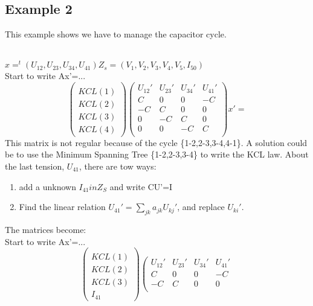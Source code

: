 \subsection{Example 2}
This example shows we have to manage the capacitor cycle.\\
\begin{figure}[h]
\centerline{
 \scalebox{0.6}{
    
 }
}\end{figure}\\
$x=^{t}(U_{12},U_{23},U_{34},U_{41})$$Z_{s}=(V_{1},V_{2},V_{3},V_{4},V_{5},I_{50})$\\
Start to write Ax'=...\
\[\left(\begin{array}{c}
  \\
KCL(1)\\KCL(2)\\KCL(3)\\KCL(4)
\end{array}\right)
\left(\begin{array}{cccc}
  U_{12}'&U_{23}'&U_{34}'&U_{41}'\\
  \hline
  C&0&0&-C\\
  -C&C&0&0\\
  0&-C&C&0\\
  0&0&-C&C\\  
\end{array}\right)x'=
\]
This matrix is not regular because of the cycle \{1-2,2-3,3-4,4-1\}. A solution could be to use the Minimum
Spanning Tree \{1-2,2-3,3-4\} to write the KCL law. About the last tension, $U_{41}$, there are tow
ways:
\begin{enumerate}
\item add a unknown $I_{41} in Z_{S}$ and write CU'=I
\item Find the linear relation $U_{41}'= \sum_{jk}^{}a_{jk}U_{kj}'$, and replace $U_{ki}'$.
\end{enumerate}
The matrices become:\\
Start to write Ax'=...\
\[\left(\begin{array}{c}
  \\
KCL(1)\\KCL(2)\\KCL(3)\\I_{41}
\end{array}\right)
\left(\begin{array}{cccc}
  U_{12}'&U_{23}'&U_{34}'&U_{41}'\\
  \hline
  C&0&0&-C\\
  -C&C&0&0\\

\end{array}\]$$
